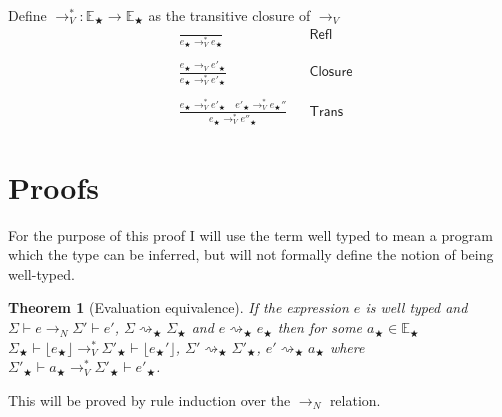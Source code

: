\documentclass[float=false, crop=false]{standalone}
\newtheorem{theorem}{Theorem}
\numberwithin{subcase}{case}
\newcommand{\tlang}{\bigstar}
\newcommand{\unwrap}[1]{\lfloor #1 \rfloor}
\newcommand{\tcbn}{\rightarrow_N}
\newcommand{\tcbv}{\rightarrow_V}
\newcommand{\tccbv}{\rightarrow_V^*}
\newcommand{\tlthunk}{\rightsquigarrow_\tlang}
\begin{document}
Define $\tccbv: \mathbb{E}_\tlang \rightarrow \mathbb{E}_\tlang$ as the transitive closure of $\tcbv$
\begin{align*}
  &\frac{}{e_\tlang \tccbv e_\tlang} && \mathsf{Refl}\\ \\
  &\frac{e_\tlang \tcbv e'_\tlang}{e_\tlang \tccbv e'_\tlang} 
    && \mathsf{Closure}\\ \\
  &\frac{e_\tlang \tccbv e'_\tlang \quad e'_\tlang \tccbv e_\tlang'' }{e_\tlang \tccbv e''_\tlang} && \mathsf{Trans}
\end{align*}

\section{Proofs}

For the purpose of this proof I will use the term well typed to mean a program which the 
type can be inferred, but will not formally define the notion of being well-typed.

\begin{theorem}[Evaluation equivalence]
If the expression $e$ is well typed and
\mbox{$\Sigma \vdash e \tcbn \Sigma' \vdash e'$}, $\Sigma \tlthunk \Sigma_\tlang$ and \mbox{$e \tlthunk e_\tlang$} 
then for some $a_\tlang \in \mathbb{E}_\tlang$ 
\mbox{$\Sigma_\tlang \vdash \unwrap{e_\tlang}\tccbv \Sigma'_\tlang \vdash \unwrap{e_\tlang'}$},
\mbox{$\Sigma' \tlthunk \Sigma'_\tlang$}, \mbox{$e' \tlthunk a_\tlang$} where 
\mbox{$\Sigma'_\tlang \vdash a_\tlang \tccbv \Sigma'_\tlang \vdash  e'_\tlang$}.
\end{theorem}



This will be proved by rule induction over the $\tcbn$ relation. 
\end{document}
